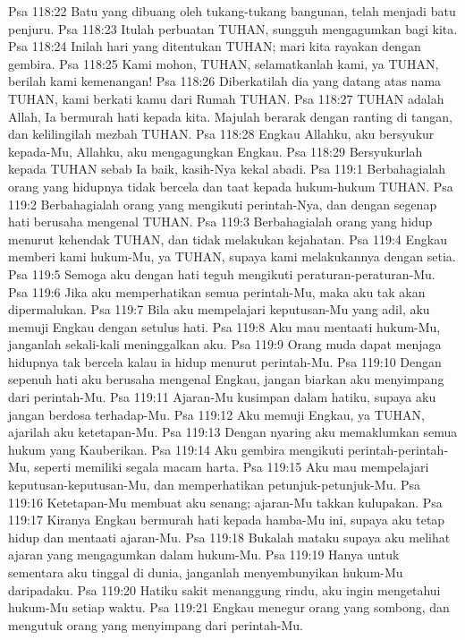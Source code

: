 Psa 118:22  Batu yang dibuang oleh tukang-tukang bangunan, telah menjadi batu penjuru.
Psa 118:23  Itulah perbuatan TUHAN, sungguh mengagumkan bagi kita.
Psa 118:24  Inilah hari yang ditentukan TUHAN; mari kita rayakan dengan gembira.
Psa 118:25  Kami mohon, TUHAN, selamatkanlah kami, ya TUHAN, berilah kami kemenangan!
Psa 118:26  Diberkatilah dia yang datang atas nama TUHAN, kami berkati kamu dari Rumah TUHAN.
Psa 118:27  TUHAN adalah Allah, Ia bermurah hati kepada kita. Majulah berarak dengan ranting di tangan, dan kelilingilah mezbah TUHAN.
Psa 118:28  Engkau Allahku, aku bersyukur kepada-Mu, Allahku, aku mengagungkan Engkau.
Psa 118:29  Bersyukurlah kepada TUHAN sebab Ia baik, kasih-Nya kekal abadi.
Psa 119:1  Berbahagialah orang yang hidupnya tidak bercela dan taat kepada hukum-hukum TUHAN.
Psa 119:2  Berbahagialah orang yang mengikuti perintah-Nya, dan dengan segenap hati berusaha mengenal TUHAN.
Psa 119:3  Berbahagialah orang yang hidup menurut kehendak TUHAN, dan tidak melakukan kejahatan.
Psa 119:4  Engkau memberi kami hukum-Mu, ya TUHAN, supaya kami melakukannya dengan setia.
Psa 119:5  Semoga aku dengan hati teguh mengikuti peraturan-peraturan-Mu.
Psa 119:6  Jika aku memperhatikan semua perintah-Mu, maka aku tak akan dipermalukan.
Psa 119:7  Bila aku mempelajari keputusan-Mu yang adil, aku memuji Engkau dengan setulus hati.
Psa 119:8  Aku mau mentaati hukum-Mu, janganlah sekali-kali meninggalkan aku.
Psa 119:9  Orang muda dapat menjaga hidupnya tak bercela kalau ia hidup menurut perintah-Mu.
Psa 119:10  Dengan sepenuh hati aku berusaha mengenal Engkau, jangan biarkan aku menyimpang dari perintah-Mu.
Psa 119:11  Ajaran-Mu kusimpan dalam hatiku, supaya aku jangan berdosa terhadap-Mu.
Psa 119:12  Aku memuji Engkau, ya TUHAN, ajarilah aku ketetapan-Mu.
Psa 119:13  Dengan nyaring aku memaklumkan semua hukum yang Kauberikan.
Psa 119:14  Aku gembira mengikuti perintah-perintah-Mu, seperti memiliki segala macam harta.
Psa 119:15  Aku mau mempelajari keputusan-keputusan-Mu, dan memperhatikan petunjuk-petunjuk-Mu.
Psa 119:16  Ketetapan-Mu membuat aku senang; ajaran-Mu takkan kulupakan.
Psa 119:17  Kiranya Engkau bermurah hati kepada hamba-Mu ini, supaya aku tetap hidup dan mentaati ajaran-Mu.
Psa 119:18  Bukalah mataku supaya aku melihat ajaran yang mengagumkan dalam hukum-Mu.
Psa 119:19  Hanya untuk sementara aku tinggal di dunia, janganlah menyembunyikan hukum-Mu daripadaku.
Psa 119:20  Hatiku sakit menanggung rindu, aku ingin mengetahui hukum-Mu setiap waktu.
Psa 119:21  Engkau menegur orang yang sombong, dan mengutuk orang yang menyimpang dari perintah-Mu.
